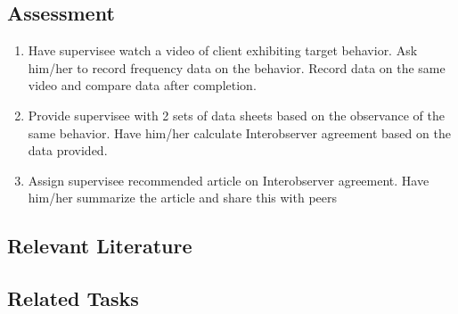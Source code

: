 \subsection{Assessment}
\begin{enumerate}
\item Have supervisee watch a video of client exhibiting target behavior. Ask him/her to record frequency data on the behavior. Record data on the same video and compare data after completion. 
\item Provide supervisee with 2 sets of data sheets based on the observance of the same behavior. Have him/her calculate Interobserver agreement based on the data provided.
\item Assign supervisee recommended article on Interobserver agreement. Have him/her summarize the article and share this with peers 
\end{enumerate}
%
\subsection{Relevant Literature}
\begin{refsection}
\nocite{cooper2007applied,boyce2000evaluation,johnston2010strategies,watkins2000interobserver}
\printbibliography[heading=none]
\end{refsection}
%
\subsection{Related Tasks}
\fouraOne{}\\
\fouraNine{}\\
\fourbTwo{}\\
\fourgSix{}\\
\fourhTwo{}\\
\fouriOne{}\\
\fouriFive{}\\
\fourjNine{}\\
\fourkFive{}\\

